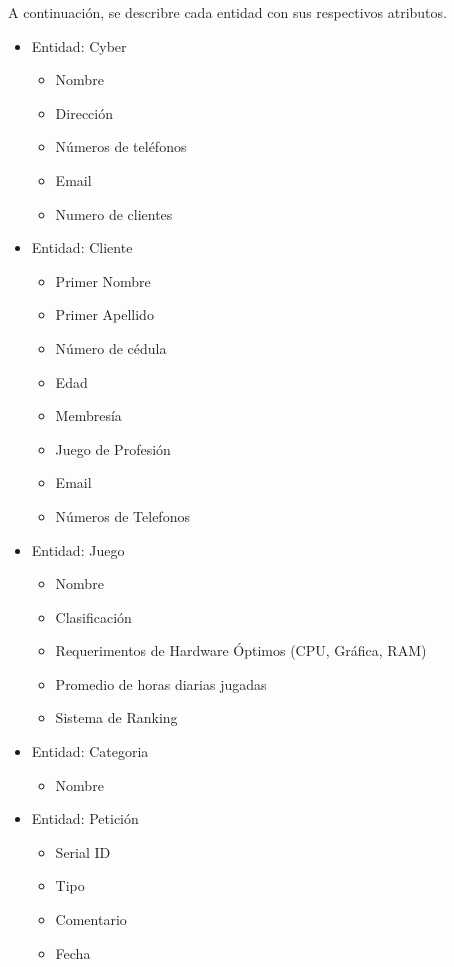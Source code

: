 \documentclass[a4paper,12pt]{article}
\begin{document}
A continuación, se describre cada entidad con sus respectivos atributos.\\
\begin{itemize}
\item Entidad: Cyber
\begin{itemize}
\item Nombre
\item Dirección
\item Números de teléfonos
\item Email
\item Numero de clientes
\end{itemize}

\item Entidad: Cliente
\begin{itemize}
\item Primer Nombre
\item Primer Apellido
\item Número de cédula
\item Edad
\item Membresía
\item Juego de Profesión
\item Email
\item Números de Telefonos
\end{itemize}

\item Entidad: Juego
\begin{itemize}
\item Nombre
\item Clasificación
\item Requerimentos de Hardware Óptimos (CPU, Gráfica, RAM)
\item Promedio de horas diarias jugadas
\item Sistema de Ranking
\end{itemize}

\item Entidad: Categoria
\begin{itemize}
\item Nombre
\end{itemize}

\item Entidad: Petición
\begin{itemize}
\item Serial ID
\item Tipo
\item Comentario
\item Fecha
\end{itemize}


\end{itemize}
\end{document}
